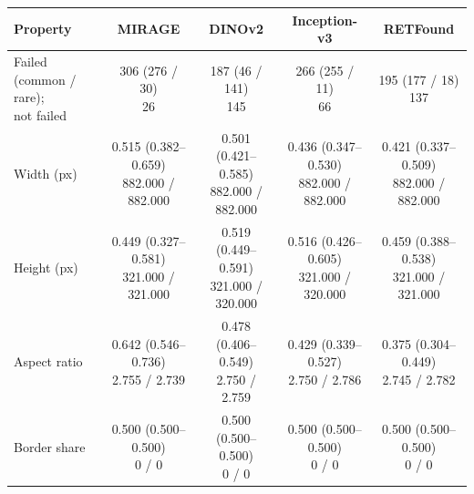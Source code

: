 \begin{tabular}{@{}lcccc@{}}
\toprule
Property & MIRAGE & DINOv2 & Inception-v3 & RETFound \\
\midrule
\makecell[l]{Failed (common / rare);\\not failed} & \makecell{306 (276 / 30)\\{\scriptsize 26}} & \makecell{187 (46 / 141)\\{\scriptsize 145}} & \makecell{266 (255 / 11)\\{\scriptsize 66}} & \makecell{195 (177 / 18)\\{\scriptsize 137}} \\
\midrule
Width (px) & \makecell{0.515 (0.382--0.659)\\{\scriptsize 882.000 / 882.000}} & \makecell{0.501 (0.421--0.585)\\{\scriptsize 882.000 / 882.000}} & \makecell{0.436 (0.347--0.530)\\{\scriptsize 882.000 / 882.000}} & \makecell{0.421 (0.337--0.509)\\{\scriptsize 882.000 / 882.000}} \\
Height (px) & \makecell{0.449 (0.327--0.581)\\{\scriptsize 321.000 / 321.000}} & \makecell{0.519 (0.449--0.591)\\{\scriptsize 321.000 / 320.000}} & \makecell{0.516 (0.426--0.605)\\{\scriptsize 321.000 / 320.000}} & \makecell{0.459 (0.388--0.538)\\{\scriptsize 321.000 / 321.000}} \\
Aspect ratio & \makecell{0.642 (0.546--0.736)\\{\scriptsize 2.755 / 2.739}} & \makecell{0.478 (0.406--0.549)\\{\scriptsize 2.750 / 2.759}} & \makecell{0.429 (0.339--0.527)\\{\scriptsize 2.750 / 2.786}} & \makecell{0.375 (0.304--0.449)\\{\scriptsize 2.745 / 2.782}} \\
Border share & \makecell{0.500 (0.500--0.500)\\{\scriptsize 0 / 0}} & \makecell{0.500 (0.500--0.500)\\{\scriptsize 0 / 0}} & \makecell{0.500 (0.500--0.500)\\{\scriptsize 0 / 0}} & \makecell{0.500 (0.500--0.500)\\{\scriptsize 0 / 0}} \\

\end{tabular}
